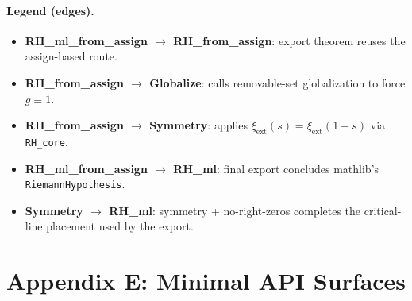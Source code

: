 \documentclass[11pt]{article}
\theoremstyle{plain}
\theoremstyle{definition}
\begin{document}
\paragraph{Legend (edges).}
\begin{itemize}
  \item \textbf{RH\_ml\_from\_assign \(\rightarrow\) RH\_from\_assign}: export theorem reuses the assign-based route.
  \item \textbf{RH\_from\_assign \(\rightarrow\) Globalize}: calls removable-set globalization to force \(g\equiv 1\).
  \item \textbf{RH\_from\_assign \(\rightarrow\) Symmetry}: applies \(\xi_{\mathrm{ext}}(s)=\xi_{\mathrm{ext}}(1-s)\) via \texttt{RH\_core}.
  \item \textbf{RH\_ml\_from\_assign \(\rightarrow\) RH\_ml}: final export concludes mathlib’s \texttt{RiemannHypothesis}.
  \item \textbf{Symmetry \(\rightarrow\) RH\_ml}: symmetry + no-right-zeros completes the critical-line placement used by the export.
\end{itemize}


\section*{Appendix E: Minimal API Surfaces}
\end{document}

